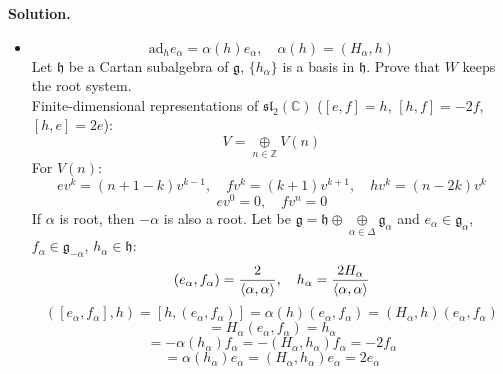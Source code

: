 \documentclass[12pt]{article}
\theoremstyle{definition}
\begin{document}
\begin{enumerate}
\begin{itemize}
    \end{itemize}
    \textbf{Solution.}
    \begin{itemize}
        \item
        \begin{equation}
            \text{ad}_he_\alpha=\alpha(h)e_\alpha,\quad \alpha(h)=(H_\alpha,h)
        \end{equation}
        Let $\mathfrak{h}$ be a Cartan subalgebra of $\mathfrak{g}$, $\{h_\alpha\}$ is a basis in $\mathfrak{h}$. Prove that $W$ keeps the root system.\\
        Finite-dimensional representations of $\mathfrak{sl}_2(\mathbb{C})$ ($[e,f]=h$, $[h,f]=-2f$, $[h,e]=2e$):
        \begin{equation}
            V=\underset{n\in\mathbb{Z}}{\oplus}V(n)
        \end{equation}
        For $V(n)$:
        \begin{equation}
            ev^k=(n+1-k)v^{k-1},\quad fv^k=(k+1)v^{k+1},\quad hv^k=(n-2k)v^k
        \end{equation}
        \begin{equation}
            ev^0=0,\quad fv^n=0
        \end{equation}
        If $\alpha$ is root, then $-\alpha$ is also a root. Let be $\mathfrak{g}=\mathfrak{h}\oplus\underset{\alpha\in\Delta}{\oplus}\mathfrak{g}_\alpha$ and $e_\alpha\in\mathfrak{g}_\alpha$, $f_\alpha\in\mathfrak{g}_{-\alpha}$, $h_\alpha\in\mathfrak{h}$:
        \begin{equation}
            (e_\alpha,f_\alpha)=\frac{2}{\braket{\alpha,\alpha}},\quad h_\alpha=\frac{2H_\alpha}{\braket{\alpha,\alpha}}
        \end{equation}
        \begin{equation}
            ([e_\alpha,f_\alpha],h)=[h,(e_\alpha,f_\alpha)]=\alpha(h)(e_\alpha,f_\alpha)=(H_\alpha,h)(e_\alpha,f_\alpha)
        \end{equation}
        \begin{equation}
            [e_\alpha,f_\alpha]=H_\alpha(e_\alpha,f_\alpha)=h_\alpha
        \end{equation}
        \begin{equation}
            [h_\alpha,f_\alpha]=-\alpha(h_\alpha)f_\alpha=-(H_\alpha,h_\alpha)f_\alpha=-2f_\alpha
        \end{equation}
        \begin{equation}
            [h_\alpha,e_\alpha]=\alpha(h_\alpha)e_\alpha=(H_\alpha,h_\alpha)e_\alpha=2e_\alpha

\end{equation}
\end{itemize}
\end{enumerate}
\end{document}
